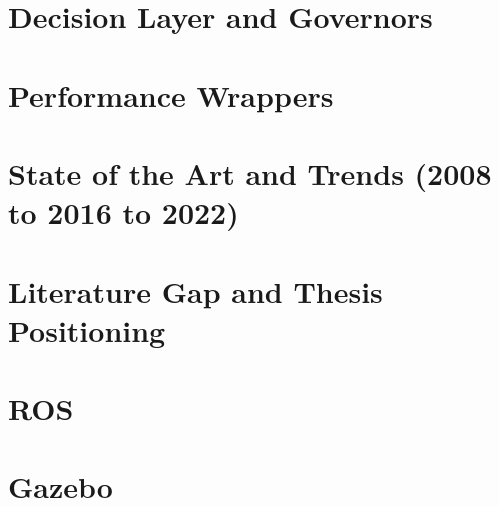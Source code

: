 {\section{Decision Layer and Governors}


\section{Performance Wrappers}


\section{State of the Art and Trends (2008 to 2016 to 2022)}



\section{Literature Gap and Thesis Positioning}



\section{ROS}


\section{Gazebo}





}